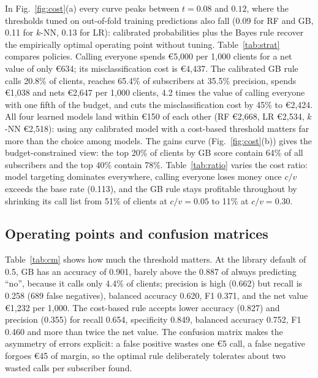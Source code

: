 \documentclass[conference]{IEEEtran}
\begin{document}
In Fig.~\ref{fig:cost}(a) every curve peaks between $t=0.08$ and $0.12$, where the thresholds tuned on out-of-fold training predictions also fall (0.09 for RF and GB, 0.11 for $k$-NN, 0.13 for LR): calibrated probabilities plus the Bayes rule recover the empirically optimal operating point without tuning. Table~\ref{tab:strat} compares policies. Calling everyone spends \euro5,000 per 1,000 clients for a net value of only \euro634; its misclassification cost is \euro4,437. The calibrated GB rule calls 20.8\% of clients, reaches 65.4\% of subscribers at 35.5\% precision, spends \euro1,038 and nets \euro2,647 per 1,000 clients, 4.2 times the value of calling everyone with one fifth of the budget, and cuts the misclassification cost by 45\% to \euro2,424. All four learned models land within \euro150 of each other (RF \euro2,668, LR \euro2,534, $k$-NN \euro2,518): using any calibrated model with a cost-based threshold matters far more than the choice among models. The gains curve (Fig.~\ref{fig:cost}(b)) gives the budget-constrained view: the top 20\% of clients by GB score contain 64\% of all subscribers and the top 40\% contain 78\%. Table~\ref{tab:ratio} varies the cost ratio: model targeting dominates everywhere, calling everyone loses money once $c/v$ exceeds the base rate (0.113), and the GB rule stays profitable throughout by shrinking its call list from 51\% of clients at $c/v=0.05$ to 11\% at $c/v=0.30$.

\subsection{Operating points and confusion matrices}
\begin{table}[t]
\caption{Confusion matrices of gradient boosting on the test set at the default threshold and for the recommended calibrated rule.}
\label{tab:cm}
\centering\scriptsize

\end{table}

Table~\ref{tab:cm} shows how much the threshold matters. At the library default of 0.5, GB has an accuracy of 0.901, barely above the 0.887 of always predicting ``no'', because it calls only 4.4\% of clients; precision is high (0.662) but recall is 0.258 (689 false negatives), balanced accuracy 0.620, F1 0.371, and the net value \euro1,232 per 1,000. The cost-based rule accepts lower accuracy (0.827) and precision (0.355) for recall 0.654, specificity 0.849, balanced accuracy 0.752, F1 0.460 and more than twice the net value. The confusion matrix makes the asymmetry of errors explicit: a false positive wastes one \euro5 call, a false negative forgoes \euro45 of margin, so the optimal rule deliberately tolerates about two wasted calls per subscriber found.
\end{document}
